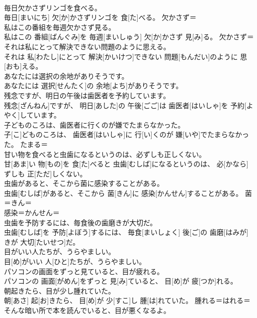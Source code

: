 \documentclass[8pt]{extreport}
\begin{document}
\begin{CJK}{UTF8}{min}
\\	毎日欠かさずリンゴを食べる。	
\\	毎日[まいにち] 欠[か]かさずリンゴを 食[た]べる。	欠かさず＝ 
\\	私はこの番組を毎週欠かさず見る。	
\\	私はこの 番組[ばんぐみ]を 毎週[まいしゅう] 欠[か]かさず 見[み]る。	欠かさず＝ 
\\	それは私にとって解決できない問題のように思える。	
\\	それは 私[わたし]にとって 解決[かいけつ]できない 問題[もんだい]のように 思[おも]える。	
\\	あなたには選択の余地がありそうです。	
\\	あなたには 選択[せんたく]の 余地[よち]がありそうです。	
\\	残念ですが、明日の午後は歯医者を予約しています。	
\\	残念[ざんねん]ですが、 明日[あした]の 午後[ごご]は 歯医者[はいしゃ]を 予約[よやく]しています。	
\\	子どものころは、歯医者に行くのが嫌でたまらなかった。	
\\	子[こ]どものころは、 歯医者[はいしゃ]に 行[い]くのが 嫌[いや]でたまらなかった。	たまる＝ 
\\	甘い物を食べると虫歯になるというのは、必ずしも正しくない。	
\\	甘[あま]い 物[もの]を 食[た]べると 虫歯[むしば]になるというのは、 必[かなら]ずしも 正[ただ]しくない。	
\\	虫歯があると、そこから菌に感染することがある。	
\\	虫歯[むしば]があると、そこから 菌[きん]に 感染[かんせん]することがある。	菌＝きん＝ 
\\	感染＝かんせん＝ 
\\	虫歯を予防するには、毎食後の歯磨きが大切だ。	
\\	虫歯[むしば]を 予防[よぼう]するには、 毎食[まいしょく] 後[ご]の 歯磨[はみが]きが 大切[たいせつ]だ。	
\\	目がいい人たちが、うらやましい。	
\\	目[め]がいい 人[ひと]たちが、うらやましい。	
\\	パソコンの画面をずっと見ていると、目が疲れる。	
\\	パソコンの 画面[がめん]をずっと 見[み]ていると、 目[め]が 疲[つか]れる。	
\\	朝起きたら、目が少し腫れていた。	
\\	朝[あさ] 起[お]きたら、 目[め]が 少[すこ]し 腫[は]れていた。	腫れる＝はれる＝ 
\\	そんな暗い所で本を読んでいると、目が悪くなるよ。	

\end{CJK}
\end{document}
